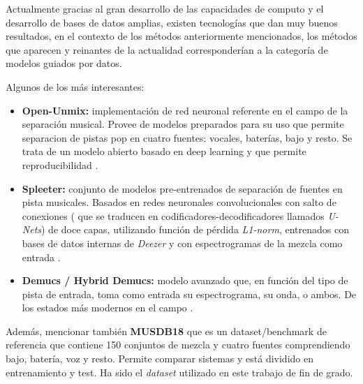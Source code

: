 Actualmente gracias al gran desarrollo de las capacidades de computo y el desarrollo de bases de datos amplias, existen tecnologías que dan muy buenos resultados, en el contexto de los métodos anteriormente mencionados, los métodos que aparecen y reinantes de la actualidad corresponderían a la categoría de modelos guiados por datos.

Algunos de los más interesantes:

\begin{itemize}
    \item \textbf{Open-Unmix: } implementación de red neuronal referente en el campo de la separación musical. Provee de modelos preparados para su uso que permite separacion de pistas pop en cuatro fuentes: vocales, baterías, bajo y resto. Se trata de un modelo abierto basado en deep learning y que permite reproducibilidad \cite{openunmix2019}.
    \item \textbf{Spleeter: } conjunto de modelos pre-entrenados de separación de fuentes en pista musicales. Basados en redes neuronales convolucionales con salto de conexiones ( que se traducen en codificadores-decodificadores llamados \textit{U-Nets}) de doce capas, utilizando función de pérdida \textit{L1-norm}, entrenados con bases de datos internas de \textit{Deezer} y con espectrogramas de la mezcla como entrada \cite{Deezer}. 
    \item \textbf{Demucs / Hybrid Demucs: } modelo avanzado que, en función del tipo de pista de entrada, toma como entrada su espectrograma, su onda, o ambos. De los estados más modernos en el campo \cite{HybridDemucs}.
\end{itemize}

Además, mencionar también \textbf{MUSDB18} que es un dataset/benchmark de referencia que contiene 150 conjuntos de mezcla y cuatro fuentes comprendiendo bajo, batería, voz y resto. Permite comparar sistemas y está dividido en entrenamiento y test. Ha sido el \textit{dataset} utilizado en este trabajo de fin de grado.